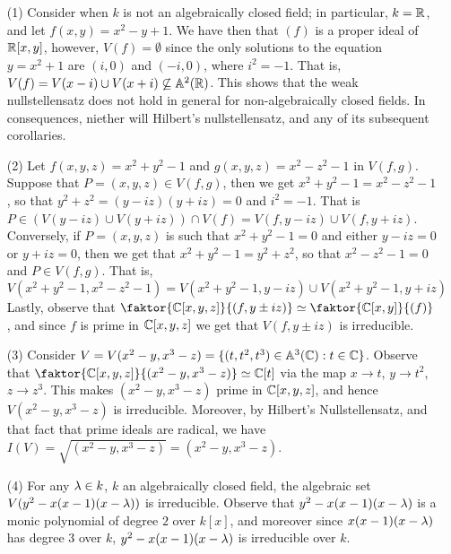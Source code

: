 \begin{example}\label{example_1.6}
  \begin{enumerate}
    \item[(1)] Consider when $k$ is not an algebraically closed field; in
      particular,  $k=\mathbb{R}$, and let  $f(x,y)=x^2-y+1$. We have then that $(f)$ is
      a proper ideal of $\mathbb{R}[x,y]$, however, $V(f)=\emptyset$ since the only
      solutions to the equation $y=x^2+1$ are $(i,0)$ and $(-i,0)$, where
      $i^2=-1$. That is, $V(f)=V(x-i) \cup V(x+i) \not\subseteq \mathbb{A}^2(\mathbb{R})$. This
      shows that  the weak nullstellensatz does not hold in general for
      non-algebraically closed fields. In consequences, niether will Hilbert's
      nullstellensatz, and any of its subsequent corollaries.

    \item[(2)] Let $f(x,y,z)=x^2+y^2-1$ and $g(x,y,z)=x^2-z^2-1$ in $V(f,g)$.
      Suppose that $P=(x,y,z) \in V(f,g)$, then we get $x^2+y^2-1=x^2-z^2-1$, so
      that  $y^2+z^2=(y-iz)(y+iz)=0$ and $i^2=-1$. That is  $P \in (V(y-iz) \cup
      V(y+iz)) \cap V(f)=V(f,y-iz) \cup V(f,y+iz)$. Conversely, if $P=(x,y,z)$
      is such that $x^2+y^2-1=0$ and either  $y-iz=0$ or $y+iz=0$, then we get
      that  $x^2+y^2-1=y^2+z^2$, so that $x^2-z^2-1=0$ and  $P \in V(f,g)$. That
      is,
      \begin{equation*}
        V(x^2+y^2-1,x^2-z^2-1)=V(x^2+y^2-1,y-iz) \cup V(x^2+y^2-1,y+iz)
      \end{equation*}
      Lastly, observe that $\faktor{\C[x,y,z]}{(f,y\pm{iz})} \simeq
      \faktor{\C[x,y]}{(f)}$, and since $f$ is prime in $\mathbb{C}[x,y,z]$ we get
      that $V(f,y\pm{iz})$ is irreducible.

    \item[(3)] Consider $V=V(x^2-y,x^3-z)=\{(t,t^2,t^3) \in \mathbb{A}^3(\mathbb{C}) : t \in
      \mathbb{C}\}$. Observe that $\faktor{\C[x,y,z]}{(x^2-y,x^3-z)} \simeq \C[t]$ via
      the map $x \xrightarrow{} t$, $y \xrightarrow{} t^2$, $z \xrightarrow{}
      z^3$. This makes $(x^2-y,x^3-z)$ prime in $\mathbb{C}[x,y,z]$, and hence
      $V(x^2-y,x^3-z)$ is irreducible. Moreover, by Hilbert's Nullstellensatz,
      and that fact that prime ideals are radical, we have
      $I(V)=\sqrt{(x^2-y,x^3-z)}=(x^2-y,x^3-z)$.

    \item[(4)] For any $\lambda \in k$, $k$ an algebraically closed field, the
      algebraic set $V(y^2-x(x-1)(x-\lambda))$ is irreducible. Observe that
      $y^2-x(x-1)(x-\lambda)$ is a monic polynomial of degree $2$ over $k[x]$, and
      moreover since $x(x-1)(x-\lambda)$ has degree $3$ over $k$, $y^2-x(x-1)(x-\lambda)$
      is irreducible over $k$.


\end{enumerate}
\end{example}
